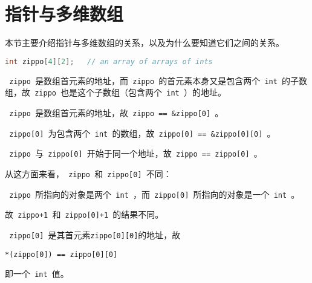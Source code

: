 \section{指针与多维数组}
\begin{frame}[fragile]\ft{\secname}
本节主要介绍指针与多维数组的关系，以及为什么要知道它们之间的关系。
\vspace{0.1in}

\end{frame}

\begin{frame}[fragile]\ft{\secname}
\begin{lstlisting}[language=c,backgroundcolor=\color{red!20}]
int zippo[4][2];   // an array of arrays of ints
\end{lstlisting}
\lstinline| zippo |是数组首元素的地址，而\lstinline| zippo |的首元素本身又是包含两个\lstinline| int |的子数组，故\lstinline| zippo |也是这个子数组（包含两个\lstinline| int |）的地址。
\end{frame}

\begin{frame}[fragile]\ft{\secname}
 \lstinline| zippo |是数组首元素的地址，故\lstinline| zippo == &zippo[0] |。\vspace{0.1in}
 
 \lstinline| zippo[0] |为包含两个\lstinline| int |的数组，故\lstinline| zippo[0] == &zippo[0][0] |。\vspace{0.1in}
 
 \lstinline| zippo |与\lstinline| zippo[0] |开始于同一个地址，故\lstinline| zippo == zippo[0] |。

\end{frame}

\begin{frame}[fragile]\ft{\secname}
从这方面来看，\lstinline| zippo |和\lstinline| zippo[0] |不同：\vspace{0.15in}
 
\lstinline| zippo |所指向的对象是两个\lstinline| int |，而\lstinline| zippo[0] |所指向的对象是一个\lstinline| int |。
\vspace{0.15in}
 
故\lstinline| zippo+1 |和\lstinline| zippo[0]+1 |的结果不同。
\end{frame}

\begin{frame}[fragile]\ft{\secname}
\vspace{0.15in}
 
\lstinline| zippo[0] |是其首元素\lstinline|zippo[0][0]|的地址，故 \vspace{.1in}

\begin{lstlisting}
*(zippo[0]) == zippo[0][0]
\end{lstlisting} \vspace{.1in}

即一个\lstinline| int |值。 
\end{frame}

